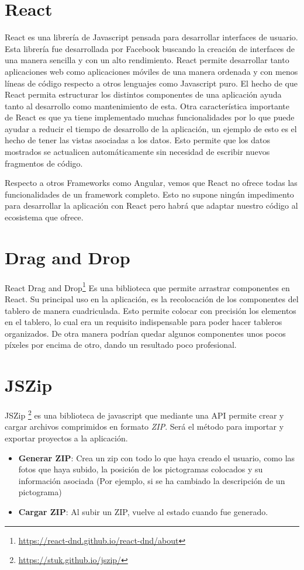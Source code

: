 \section{React}

React es una librería de Javascript pensada para desarrollar interfaces de usuario. Esta librería fue desarrollada por Facebook buscando la creación de interfaces de una manera sencilla y con un alto rendimiento. 
React permite desarrollar tanto aplicaciones web como aplicaciones móviles de una manera ordenada y con menos líneas de código respecto a otros lenguajes como Javascript puro. El hecho de que React permita estructurar los distintos componentes de una aplicación ayuda tanto al desarrollo como mantenimiento de esta.
Otra característica importante de React es que ya tiene implementado muchas funcionalidades por lo que puede ayudar a reducir el tiempo de desarrollo de la aplicación, un ejemplo de esto es el hecho de tener las vistas asociadas a los datos. Esto permite que los datos mostrados se actualicen automáticamente sin necesidad de escribir nuevos fragmentos de código.

Respecto a otros Frameworks como Angular, vemos que React no ofrece todas las funcionalidades de un framework completo. Esto no supone ningún impedimento para desarrollar la aplicación con React pero habrá que adaptar nuestro código al ecosistema que ofrece.

\section{Drag and Drop}

React Drag and Drop\footnote{\url{https://react-dnd.github.io/react-dnd/about}} Es una biblioteca que permite arrastrar componentes en React. Su principal uso en la aplicación, es la recolocación de los componentes del tablero de manera cuadriculada. Esto permite colocar con precisión los elementos en el tablero, lo cual era un requisito indispensable para poder hacer tableros organizados. De otra manera podrían quedar algunos componentes unos pocos píxeles por encima de otro, dando un resultado poco profesional.

\section{JSZip}

JSZip \footnote{\url{https://stuk.github.io/jszip/}} es una biblioteca de javascript que mediante una API permite crear y cargar archivos comprimidos en formato \textit{ZIP}. Será el método para importar y exportar proyectos a la aplicación.
\begin{itemize}
	\item \textbf{Generar ZIP}: Crea un zip con todo lo que haya creado el usuario, como las fotos que haya subido, la posición de los pictogramas colocados y su información asociada (Por ejemplo, si se ha cambiado la descripción de un pictograma)
	\item \textbf{Cargar ZIP}: Al subir un ZIP, vuelve al estado cuando fue generado.
\end{itemize}	